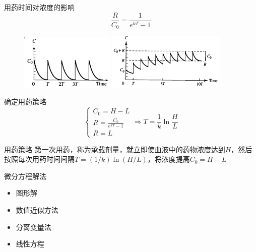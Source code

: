 \documentclass[mathserif, table]{beamer}
\begin{document}
\begin{frame}{用药时间对浓度的影响}
  \[
  \frac{R}{C_0} = \frac{1}{e^{kT}-1}
  \]

  \begin{figure}
    \includegraphics[width=0.4\textwidth]{lt.png}
    \includegraphics[width=0.5\textwidth]{st.png}
  \end{figure}
  
\end{frame}

\begin{frame}{确定用药策略}
  \[
  \left\{
  \begin{array}{l}
    C_0 = H-L\\
    R = \frac{C_0}{e^{kT}-1}\\
    R=L
  \end{array}
\right. \Rightarrow T = \frac{1}{k}\ln\frac{H}{L}
  \]

  \begin{block}{用药策略}
    第一次用药，称为承载剂量，就立即使血液中的药物浓度达到$H$，然后按照每次用药时间间隔$T=(1/k)\ln(H/L)$，将浓度提高$C_0=H-L$
  \end{block}
  
\end{frame}

\begin{frame}{微分方程解法}
  \begin{itemize}
  \item 图形解
  \item 数值近似方法
  \item 分离变量法
  \item 线性方程
  \end{itemize}
\end{frame}
\end{document}
